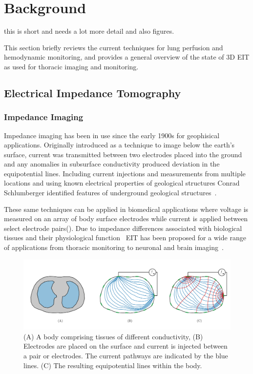 \chapter{Background}
this is short and needs a lot more detail and also figures.

This section briefly reviews the current techniques for lung perfusion and hemodynamic
monitoring, and provides a general overview 
of the state of 3D EIT as used for thoracic imaging and monitoring.

\section{Electrical Impedance Tomography}

\subsection{Impedance Imaging}
Impedance imaging has been in use since the early 1900s for geophisical applications.  
Originally introduced as a technique to image below the earth’s surface, 
current was transmitted between two electrodes placed into the ground and any 
anomalies in subsurface conductivity produced deviation 
in the equipotential lines. 
Including current injections and measurements from multiple locations and using known 
electrical properties of geological structures Conrad Schlumberger identified
features of underground geological structures~\parencite{allaud_schlumberger_1977}.

These same techniques can be applied in biomedical applications where
voltage is measured on an array of body surface electrodes 
while current is applied between select electrode pairs(). 
Due to impedance differences associated with biological tissues and their physiological 
function~\parencite{Geddes1967,McAdams1995}
EIT has been proposed for a wide range of applications from thoracic monitoring to neuronal and 
brain imaging~\parencite{Holder1992,Frerichs2016}. 

\begin{figure}
   \includegraphics[width=\textwidth]{background/imgs/current_and_equipotential_lines.pdf}
   \caption[Current and Equipotential lines]{\label{fig:cur_equip_line} 
   (A) A body comprising tissues of different conductivity, (B) Electrodes are placed on the surface 
   and current is injected between a pair or electrodes. The current pathways are indicated 
   by the blue lines. (C) The resulting equipotential lines within the body.}
\end{figure}

